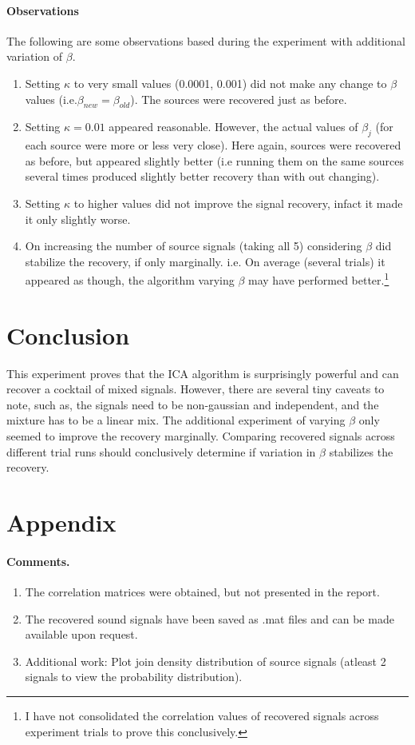 \documentclass[11pt]{article}
\begin{document}
\paragraph{Observations}
The following are some observations based during the experiment with additional variation of $\beta$.
\begin{enumerate}
\item Setting $\kappa$ to very small values (0.0001, 0.001) did not make any change to $\beta$ values (i.e.$\beta_{new} = \beta_{old}$). The sources were recovered just as before.
\item Setting $\kappa = 0.01$ appeared reasonable. However, the actual values of $\beta_j$ (for each source were more or less very close). Here again, sources were recovered as before, but appeared slightly better (i.e running them on the same sources several times produced slightly better recovery than with out changing).
\item Setting $\kappa$ to higher values did not improve the signal recovery, infact it made it only slightly worse.
\item On increasing the number of source signals (taking all 5) considering $\beta$ did stabilize the recovery, if only marginally. i.e. On average (several trials) it appeared as though, the algorithm varying $\beta$ may have performed better.\footnote{I have not consolidated the correlation values of recovered signals across experiment trials to prove this conclusively.}
\end{enumerate}

\section{Conclusion}
This experiment proves that the ICA algorithm is surprisingly powerful and can recover a cocktail of mixed signals. However, there are several tiny caveats to note, such as, the signals need to be non-gaussian and independent, and the mixture has to be a linear mix. The additional experiment of varying $\beta$ only seemed to improve the recovery marginally. Comparing recovered signals across different trial runs should conclusively determine if variation in $\beta$ stabilizes the recovery.

\section{Appendix}
\paragraph{Comments.} 
\begin{enumerate}
\item The correlation matrices were obtained, but not presented in the report.
\item The recovered sound signals have been saved as .mat files and can be made available upon request.
\item Additional work: Plot join density distribution of source signals (atleast 2 signals to view the probability distribution).
\end{enumerate}
\end{document}
